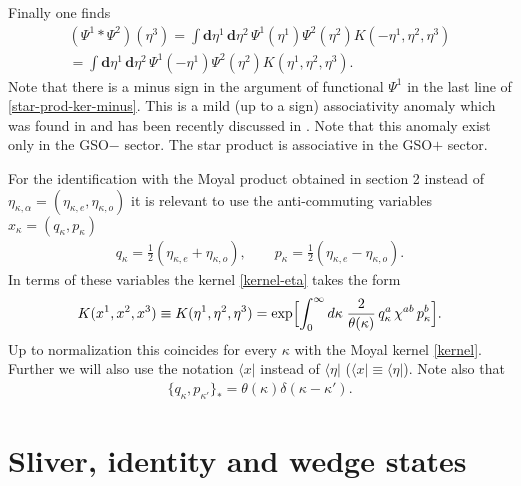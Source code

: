 \documentclass[a4paper,12pt]{article}
\begin{document}
Finally one finds
\begin{multline}
(\Psi^{1}*\Psi^{2})(\eta^3)
=
\int \mathbf{d}\eta^{1}\,\mathbf{d}\eta^{2}\,
\Psi^{1}(\eta^{1})
\Psi^{2}(\eta^{2})
K(-\eta^1,\eta^2,\eta^3)\\
=
\int \mathbf{d}\eta^{1}\,\mathbf{d}\eta^{2}\,
\Psi^{1}(-\eta^{1})
\Psi^{2}(\eta^{2})
K(\eta^1,\eta^2,\eta^3).
\label{star-prod-ker-minus}
\end{multline}
Note that there is
a minus sign in the argument of
functional $\Psi^1$ in the last line of \eqref{star-prod-ker-minus}.
This is a mild (up to a sign) associativity anomaly which was found
in \cite{BJM} and has been recently discussed in \cite{0112231}.
Note that this anomaly
exist only in the GSO$-$ sector. The star product is
associative in the GSO$+$ sector.

For the identification
with the Moyal product obtained in section 2
instead of $\eta_{\kappa,\alpha}=(\eta_{\kappa,e},\eta_{\kappa,o})$
it is relevant to use the
anti-commuting variables $x_{\kappa}=(q_{\kappa},p_{\kappa})$
\begin{gather}
q_{\kappa}=\frac{1}{2}(\eta_{\kappa,e}+\eta_{\kappa,o}),\qquad
p_{\kappa}=\frac{1}{2}(\eta_{\kappa,e}-\eta_{\kappa,o}).
\end{gather}
In terms of these variables the kernel \eqref{kernel-eta} takes the form
\begin{gather}
K(x^{1},x^{2},x^{3})\equiv K(\eta^1,\eta^2,\eta^3)
=\exp\Bigl[\int_{0}^{\infty}d\kappa\;\frac{2}{\theta(\kappa)}\,
q^{a}_{\kappa}\,\chi^{ab}\,p^{b}_{\kappa}\Bigr].
\end{gather}
Up to normalization this coincides for every $\kappa$
with the Moyal kernel \eqref{kernel}.
Further we will also use the notation $\langle x|$
instead of
$\langle\eta|$
($\langle x|\equiv\langle\eta|$).
Note also that
\begin{gather}
\{q_{\kappa},p_{\kappa'}\}_{*}=\theta(\kappa)\delta(\kappa-\kappa').
\end{gather}




\section{Sliver, identity and wedge states}
\label{sec:mpstarpr}
\setcounter{equation}{0}
\end{document}
